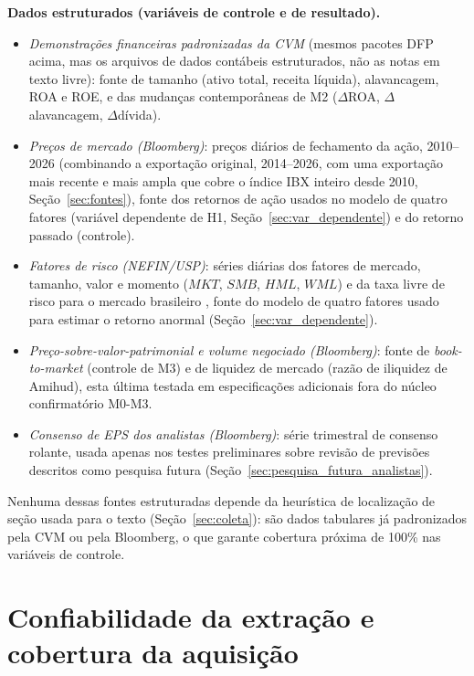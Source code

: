\documentclass[a4paper,12pt]{report}
\begin{document}
\textbf{Dados estruturados (variáveis de controle e de resultado).}
\begin{itemize}
    \item \textit{Demonstrações financeiras padronizadas da CVM} (mesmos pacotes DFP acima, mas os arquivos de dados contábeis estruturados, não as notas em texto livre): fonte de tamanho (ativo total, receita líquida), alavancagem, ROA e ROE, e das mudanças contemporâneas de M2 ($\Delta$ROA, $\Delta$alavancagem, $\Delta$dívida).
    \item \textit{Preços de mercado (Bloomberg)}: preços diários de fechamento da ação, 2010--2026 (combinando a exportação original, 2014--2026, com uma exportação mais recente e mais ampla que cobre o índice IBX inteiro desde 2010, Seção~\ref{sec:fontes}), fonte dos retornos de ação usados no modelo de quatro fatores (variável dependente de H1, Seção~\ref{sec:var_dependente}) e do retorno passado (controle).
    \item \textit{Fatores de risco (NEFIN/USP)}: séries diárias dos fatores de mercado, tamanho, valor e momento ($\mathit{MKT}$, $\mathit{SMB}$, $\mathit{HML}$, $\mathit{WML}$) e da taxa livre de risco para o mercado brasileiro \cite{nefin2026}, fonte do modelo de quatro fatores usado para estimar o retorno anormal (Seção~\ref{sec:var_dependente}).
    \item \textit{Preço-sobre-valor-patrimonial e volume negociado (Bloomberg)}: fonte de \textit{book-to-market} (controle de M3) e de liquidez de mercado (razão de iliquidez de Amihud), esta última testada em especificações adicionais fora do núcleo confirmatório M0-M3.
    \item \textit{Consenso de EPS dos analistas (Bloomberg)}: série trimestral de consenso rolante, usada apenas nos testes preliminares sobre revisão de previsões descritos como pesquisa futura (Seção~\ref{sec:pesquisa_futura_analistas}).
\end{itemize}

Nenhuma dessas fontes estruturadas depende da heurística de localização de seção usada para o texto (Seção~\ref{sec:coleta}): são dados tabulares já padronizados pela CVM ou pela Bloomberg, o que garante cobertura próxima de 100\% nas variáveis de controle.

\FloatBarrier
\section{Confiabilidade da extração e cobertura da aquisição}
\label{sec:confiabilidade}
\end{document}
